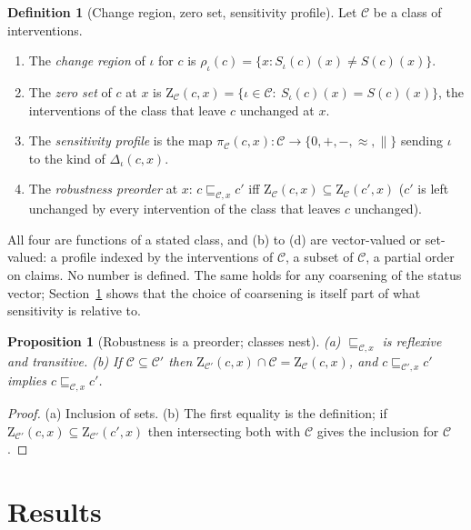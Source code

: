 \documentclass[11pt]{article}
\theoremstyle{plain}
\newtheorem{proposition}[theorem]{Proposition}
\theoremstyle{definition}
\newtheorem{definition}[theorem]{Definition}
\theoremstyle{remark}
\newcommand{\Zs}{\mathrm{Z}}
\begin{document}
\begin{definition}[Change region, zero set, sensitivity profile]\label{def:sens}
Let $\mathcal C$ be a class of interventions.
\begin{enumerate}[label=(\alph*)]
\item The \emph{change region} of $\iota$ for $c$ is $\rho_\iota(c)=\{x:S_\iota(c)(x)\ne S(c)(x)\}$.
\item The \emph{zero set} of $c$ at $x$ is $\Zs_{\mathcal C}(c,x)=\{\iota\in\mathcal C:\ S_\iota(c)(x)=S(c)(x)\}$, the interventions of the class that leave $c$ unchanged at $x$.
\item The \emph{sensitivity profile} is the map $\pi_{\mathcal C}(c,x):\mathcal C\to\{0,+,-,\approx,\parallel\}$ sending $\iota$ to the kind of $\Delta_\iota(c,x)$.
\item The \emph{robustness preorder} at $x$: $c\sqsubseteq_{\mathcal C,x}c'$ iff $\Zs_{\mathcal C}(c,x)\subseteq\Zs_{\mathcal C}(c',x)$ ($c'$ is left unchanged by every intervention of the class that leaves $c$ unchanged).
\end{enumerate}
\end{definition}

All four are functions of a stated class, and (b) to (d) are vector-valued or set-valued: a profile indexed by the interventions of $\mathcal C$, a subset of $\mathcal C$, a partial order on claims. No number is defined. The same holds for any coarsening of the status vector; Section~\ref{sec:results} shows that the choice of coarsening is itself part of what sensitivity is relative to.

\begin{proposition}[Robustness is a preorder; classes nest]\label{prop:preorder}
(a) $\sqsubseteq_{\mathcal C,x}$ is reflexive and transitive. (b) If $\mathcal C\subseteq\mathcal C'$ then $\Zs_{\mathcal C'}(c,x)\cap\mathcal C=\Zs_{\mathcal C}(c,x)$, and $c\sqsubseteq_{\mathcal C',x}c'$ implies $c\sqsubseteq_{\mathcal C,x}c'$.
\end{proposition}

\begin{proof}
(a) Inclusion of sets. (b) The first equality is the definition; if $\Zs_{\mathcal C'}(c,x)\subseteq\Zs_{\mathcal C'}(c',x)$ then intersecting both with $\mathcal C$ gives the inclusion for $\mathcal C$. \qedhere
\end{proof}

\section{Results}\label{sec:results}
\end{document}
